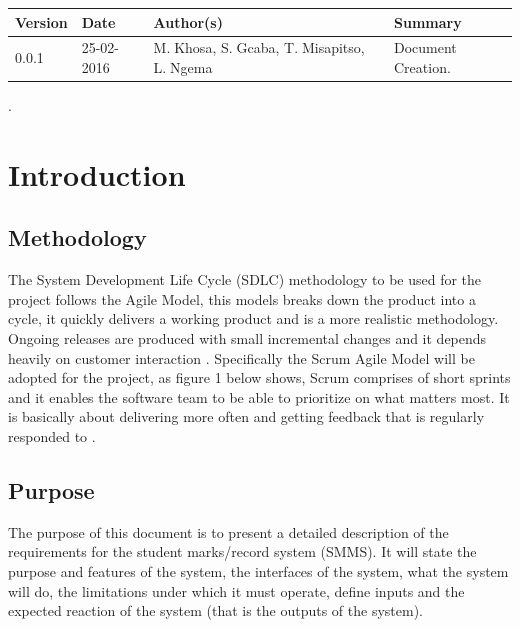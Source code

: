 \documentclass[10pt,onecolumn]{lab}
\begin{document}
\begin{center}
    \begin{tabular}{ | p{2cm} | p{3cm} | p{5cm} | p{5cm} |}
    \hline
    \textbf{Version}& \textbf{Date}& \textbf{Author(s)} & \textbf{Summary} \\ \hline
    0.0.1 & 25-02-2016 & M.$\;$Khosa, S.$\;$Gcaba, T.$\;$Misapitso, L.$\;$Ngema& Document Creation. \\ \hline

    \end{tabular}
\end{center}

\newpage


%
\pagestyle{plain}.
\section{Introduction}

\subsection{Methodology}

The System Development Life Cycle (SDLC) methodology to be used for the project follows the Agile Model, this models breaks down the product into a cycle, it quickly delivers a working product and is a more realistic methodology. Ongoing releases are produced with small incremental changes and it depends heavily on customer interaction \cite{ref7}. Specifically the Scrum Agile Model will be adopted for the project, as figure 1 below shows, Scrum comprises of short sprints and it enables the software team to be able to prioritize on what matters most. It is basically about delivering more often and getting feedback that is regularly responded to \cite{ref8}.           

\subsection{Purpose}

The purpose of this document is to present a detailed description of the requirements for the student marks/record system (SMMS). It will state the purpose and features of the system, the interfaces of the system, what the system will do, the limitations under which it must operate, define inputs and the expected reaction of the system (that is the outputs of the system). 
\end{document}
